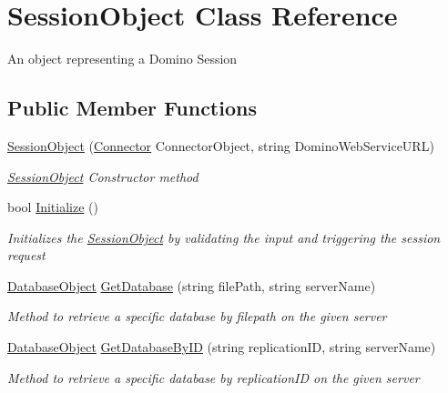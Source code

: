 \hypertarget{class_session_object}{}\section{Session\+Object Class Reference}
\label{class_session_object}


An object representing a Domino Session  


\subsection*{Public Member Functions}
\begin{DoxyCompactItemize}
\item 
\hyperlink{class_session_object_a173822a7aec467880195d79a1bc9f520}{Session\+Object} (\hyperlink{class_connector}{Connector} Connector\+Object, string Domino\+Web\+Service\+U\+RL)
\begin{DoxyCompactList}\small\item\em \hyperlink{class_session_object}{Session\+Object} Constructor method \end{DoxyCompactList}\item 
bool \hyperlink{class_session_object_af3b9c9d56d98c848061952ed935f815b}{Initialize} ()
\begin{DoxyCompactList}\small\item\em Initializes the \hyperlink{class_session_object}{Session\+Object} by validating the input and triggering the session request \end{DoxyCompactList}\item 
\hyperlink{class_database_object}{Database\+Object} \hyperlink{class_session_object_aa4871ea2dac4215bef0274a2bd71ae72}{Get\+Database} (string file\+Path, string server\+Name)
\begin{DoxyCompactList}\small\item\em Method to retrieve a specific database by filepath on the given server \end{DoxyCompactList}\item 
\hyperlink{class_database_object}{Database\+Object} \hyperlink{class_session_object_ae53bad1d2fe161060ae409024b3e0de4}{Get\+Database\+By\+ID} (string replication\+ID, string server\+Name)
\begin{DoxyCompactList}\small\item\em Method to retrieve a specific database by replication\+ID on the given server \end{DoxyCompactList}\end{DoxyCompactItemize}
